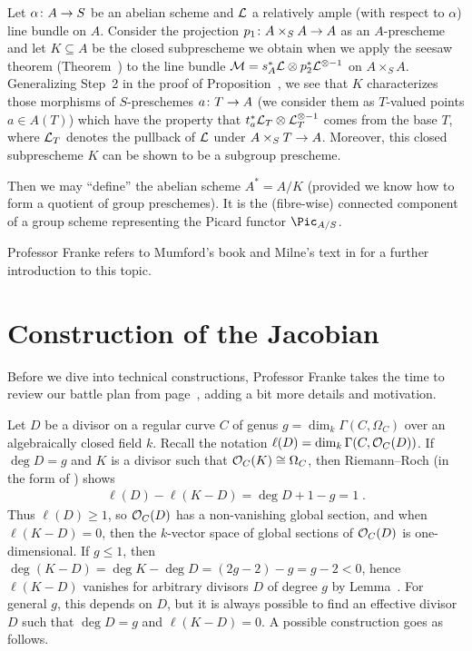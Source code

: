 \documentclass[a4paper,parskip=half,numbers=enddot, DIV=12]{scrreprt}
\renewcommand{\geq}{\geqslant}
\renewcommand{\leq}{\leqslant}
\begin{document}
\begin{rem}
	Let $\alpha\colon A\morphism S$ be an abelian scheme and $\mathcal{L}$ a relatively ample (with respect to $\alpha$) line bundle on $A$. Consider the projection $p_1\colon A\times_SA\morphism A$ as an $A$-prescheme and let $K\subseteq A$ be the closed subprescheme we obtain when we apply the seesaw theorem (Theorem~) to the line bundle $\mathcal{M}=s_A^*\mathcal{L}\otimes p_2^*\mathcal{L}^{\otimes -1}$ on $A\times_SA$. Generalizing Step~2 in the proof of Proposition~, we see that $K$ characterizes those morphisms of $S$-preschemes $a\colon T\morphism A$ (we consider them as $T$-valued points $a\in A(T)$) which have the property that $t_a^*\mathcal{L}_T\otimes \mathcal{L}_T^{\otimes -1}$ comes from the base $T$, where $\mathcal{L}_T$ denotes the pullback of $\mathcal{L}$ under $A\times_ST\morphism A$. Moreover, this closed subprescheme $K$ can be shown to be a subgroup prescheme.
	
	Then we may ``define'' the  abelian scheme $A^*=A/K$ (provided we know how to form a quotient of group preschemes). It is the (fibre-wise) connected component of a group scheme representing the Picard functor $\Pic_{A/S}$.
	
	Professor Franke refers to Mumford's book \cite{mumford1974abelian} and Milne's text in \cite{cornell1986arithmetic} for a further introduction to this topic.
\end{rem}


\chapter{Construction of the Jacobian}
Before we dive into technical constructions, Professor Franke takes the time to review our battle plan from page~\pageref{page:battlePlan}, adding a bit more details and motivation.

Let $D$ be a divisor on a regular curve $C$ of genus $g=\dim_k\Gamma(C,\Omega_C)$ over an algebraically closed field $k$. Recall the notation $\ell(D)=\dim_k\Gamma(C,\mathcal{O}_C(D))$. If $\deg D=g$ and $K$ is a divisor such that $\mathcal{O}_C(K)\cong \Omega_C$, then Riemann--Roch (in the form of \cite[Corollary~3.1.1]{alggeo2}) shows
\begin{align*}
	\ell(D)-\ell(K-D)=\deg D+1-g=1\;.
\end{align*}
Thus $\ell(D)\geq 1$, so $\mathcal{O}_C(D)$ has a non-vanishing global section, and when $\ell(K-D)=0$, then the $k$-vector space of global sections of $\mathcal{O}_C(D)$ is one-dimensional. If $g\leq 1$, then $\deg (K-D)=\deg K-\deg D=(2g-2)-g=g-2<0$, hence $\ell(K-D)$ vanishes for arbitrary divisors $D$ of degree $g$ by Lemma~. For general $g$, this depends on $D$, but it is always possible to find an effective divisor $D$ such that $\deg D=g$ and $\ell(K-D)=0$. A possible construction goes as follows.
\end{document}
